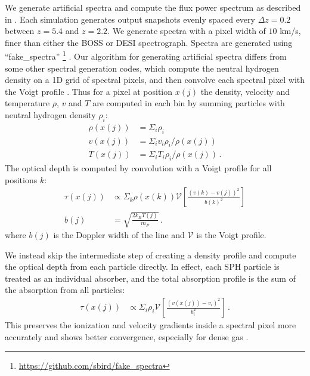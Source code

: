 \documentclass[a4paper,11pt]{article}
\newcommand{\Lya}{Lyman-$\alpha$}
\begin{document}
We generate artificial spectra and compute the flux power spectrum as described in \cite{Bird:2019}. Each simulation generates output snapshots evenly spaced every $\Delta z = 0.2$ between $z = 5.4$ and $z = 2.2$. We generate spectra with a pixel width of $10$ km/s, finer than either the BOSS or DESI spectrograph. Spectra are generated using ``fake\_spectra'' \footnote{\url{https://github.com/sbird/fake_spectra}} \cite{FSFE:2017}. Our algorithm for generating artificial spectra differs from some other spectral generation codes, which compute the neutral hydrogen density on a 1D grid of spectral pixels, and then convolve each spectral pixel with the Voigt profile \cite[e.g.~][]{Theuns:1998, Chabanier:2022}. Thus for a pixel at position $x(j)$ the density, velocity and temperature $\rho$, $v$ and $T$ are computed in each bin by summing particles with neutral hydrogen density $\rho_i$:
\begin{align}
 \rho(x(j)) &= \Sigma_i \rho_i \\
 v(x(j)) &= \Sigma_i v_i \rho_i / \rho(x(j)) \\
 T(x(j)) &= \Sigma_i T_i \rho_i / \rho(x(j))\,.
\end{align}
The optical depth is computed by convolution with a Voigt profile for all positions $k$:
\begin{align}
 \tau(x(j)) &\propto \Sigma_k \rho(x(k)) \mathcal{V}\left[\frac{(v(k) - v(j))^2}{b(k)^2}\right] \\
 b(j) &= \sqrt{\frac{2 k_B T(j)}{m_P}}\,.
\end{align}
where $b(j)$ is the Doppler width of the line and $\mathcal{V}$ is the Voigt profile.

We instead skip the intermediate step of creating a density profile and compute the optical depth from each particle directly. In effect, each SPH particle is treated as an individual absorber, and the total absorption profile is the sum of the absorption from all particles:
\begin{align}
 \tau(x(j)) &\propto \Sigma_i \rho_i \mathcal{V}\left[\frac{(v(x(j)) - v_i)^2}{b_i^2}\right]\,.
 \end{align}
This preserves the ionization and velocity gradients inside a spectral pixel more accurately and shows better convergence, especially for dense gas \cite{Bird:2015}.

\end{document}
